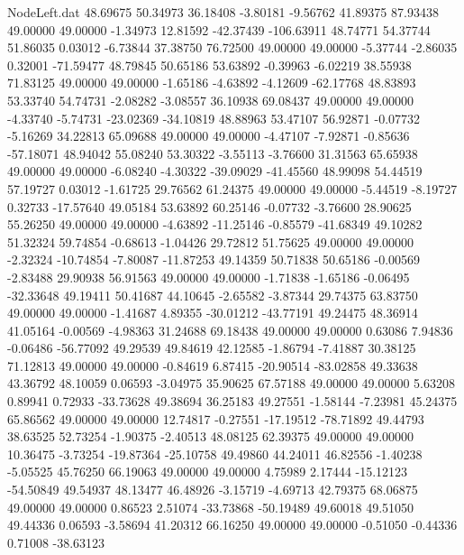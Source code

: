 \begin{filecontents}{NodeLeft.dat}
  48.69675   50.34973   36.18408    -3.80181   -9.56762   41.89375   87.93438   49.00000   49.00000   -1.34973   12.81592  -42.37439 -106.63911
  48.74771   54.37744   51.86035     0.03012   -6.73844   37.38750   76.72500   49.00000   49.00000   -5.37744   -2.86035    0.32001  -71.59477
  48.79845   50.65186   53.63892    -0.39963   -6.02219   38.55938   71.83125   49.00000   49.00000   -1.65186   -4.63892   -4.12609  -62.17768
  48.83893   53.33740   54.74731    -2.08282   -3.08557   36.10938   69.08437   49.00000   49.00000   -4.33740   -5.74731  -23.02369  -34.10819
  48.88963   53.47107   56.92871    -0.07732   -5.16269   34.22813   65.09688   49.00000   49.00000   -4.47107   -7.92871   -0.85636  -57.18071
  48.94042   55.08240   53.30322    -3.55113   -3.76600   31.31563   65.65938   49.00000   49.00000   -6.08240   -4.30322  -39.09029  -41.45560
  48.99098   54.44519   57.19727     0.03012   -1.61725   29.76562   61.24375   49.00000   49.00000   -5.44519   -8.19727    0.32733  -17.57640
  49.05184   53.63892   60.25146    -0.07732   -3.76600   28.90625   55.26250   49.00000   49.00000   -4.63892  -11.25146   -0.85579  -41.68349
  49.10282   51.32324   59.74854    -0.68613   -1.04426   29.72812   51.75625   49.00000   49.00000   -2.32324  -10.74854   -7.80087  -11.87253
  49.14359   50.71838   50.65186    -0.00569   -2.83488   29.90938   56.91563   49.00000   49.00000   -1.71838   -1.65186   -0.06495  -32.33648
  49.19411   50.41687   44.10645    -2.65582   -3.87344   29.74375   63.83750   49.00000   49.00000   -1.41687    4.89355  -30.01212  -43.77191
  49.24475   48.36914   41.05164    -0.00569   -4.98363   31.24688   69.18438   49.00000   49.00000    0.63086    7.94836   -0.06486  -56.77092
  49.29539   49.84619   42.12585    -1.86794   -7.41887   30.38125   71.12813   49.00000   49.00000   -0.84619    6.87415  -20.90514  -83.02858
  49.33638   43.36792   48.10059     0.06593   -3.04975   35.90625   67.57188   49.00000   49.00000    5.63208    0.89941    0.72933  -33.73628
  49.38694   36.25183   49.27551    -1.58144   -7.23981   45.24375   65.86562   49.00000   49.00000   12.74817   -0.27551  -17.19512  -78.71892
  49.44793   38.63525   52.73254    -1.90375   -2.40513   48.08125   62.39375   49.00000   49.00000   10.36475   -3.73254  -19.87364  -25.10758
  49.49860   44.24011   46.82556    -1.40238   -5.05525   45.76250   66.19063   49.00000   49.00000    4.75989    2.17444  -15.12123  -54.50849
  49.54937   48.13477   46.48926    -3.15719   -4.69713   42.79375   68.06875   49.00000   49.00000    0.86523    2.51074  -33.73868  -50.19489
  49.60018   49.51050   49.44336     0.06593   -3.58694   41.20312   66.16250   49.00000   49.00000   -0.51050   -0.44336    0.71008  -38.63123

\end{filecontents}
